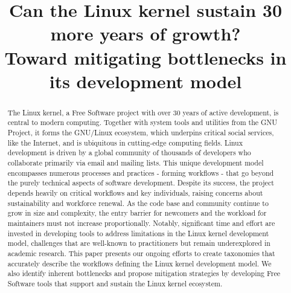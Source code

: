 \documentclass[sigconf]{acmart} %
\begin{document}
\title{Can the Linux kernel sustain 30 more years of growth?
\\Toward mitigating bottlenecks in its development model}

\pagestyle{empty}


\begin{abstract}
    The Linux kernel, a Free Software project with over 30 years of active
    development, is central to modern computing. Together with system tools and
    utilities from the GNU Project, it forms the GNU/Linux ecosystem, which
    underpins critical social services, like the Internet, and is ubiquitous in
    cutting-edge computing fields. Linux development is driven by a global
    community of thousands of developers who collaborate primarily via email and
    mailing lists. This unique development model encompasses numerous processes
    and practices -  forming workflows - that go beyond the purely technical
    aspects of software development. Despite its success, the project depends
    heavily on critical workflows and key individuals, raising concerns about
    sustainability and workforce renewal. As the code base and community continue
    to grow in size and complexity, the entry barrier for newcomers and the
    workload for maintainers must not increase proportionally. Notably,
    significant time and effort are invested in developing tools to address
    limitations in the Linux kernel development model, challenges that are
    well-known to practitioners but remain underexplored in academic research.
    This paper presents our ongoing efforts to create taxonomies that accurately
    describe the workflows defining the Linux kernel development model. We also
    identify inherent bottlenecks and propose mitigation strategies by
    developing Free Software tools that support and sustain the Linux kernel
    ecosystem.
\end{abstract}



\maketitle
\end{document}
